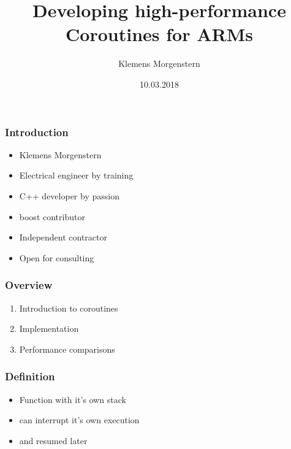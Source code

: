 \documentclass{beamer}
\begin{document}


\title{Developing high-performance Coroutines for ARMs}
\author{Klemens Morgenstern}
\date{10.03.2018}

\frame{\titlepage}



\begin{frame}
\frametitle{Introduction}
\begin{itemize}
\item Klemens Morgenstern
\item Electrical engineer by training
\item C++ developer by passion
\item boost contributor
\item Independent contractor
\item Open for consulting
\end{itemize}
\end{frame}

\begin{frame}
\frametitle{Overview}
\begin{enumerate}
\item<1-> Introduction to coroutines
\item<2-> Implementation
\item<3-> Performance comparisons
\end{enumerate}

\end{frame}

\begin{frame}
\frametitle{Definition}



\begin{itemize}
\item<1-> Function with it's own stack
\item<2-> can interrupt it's own execution
\item<3-> and resumed later
\end{itemize}
  
\end{frame}
\end{document}
